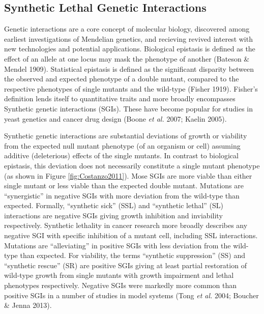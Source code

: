

\subsection{Synthetic Lethal Genetic Interactions}
Genetic interactions are a core concept of molecular biology, discovered among earliest investigations of Mendelian genetics, and recieving revived interest with new technologies and potential applications. Biological epistasis is defined as the effect of an allele at one locus may mask the phenotype of another (Bateson \& Mendel 1909). Statistical epistasis is defined as the significant disparity between the observed and expected phenotype of a double mutant, compared to the respective phenotypes of single mutants and the wild-type (Fisher 1919). Fisher's definition lends itself to quantitative traits and more broadly encompasses Synthetic genetic interactions (SGIs). These have become popular for studies in yeast genetics and cancer drug design (Boone\textit{ et al.} 2007; Kaelin 2005).


Synthetic genetic interactions are substantial deviations of growth or viability from the expected null mutant phenotype (of an organism or cell) assuming additive (deleterious) effects of the single mutants. In contrast to biological epistasis, this deviation does not necessarily constitute a single mutant phenotype (as shown in Figure \ref{fig:Costanzo2011}). Mose SGIs are more viable than either single mutant or less viable than the expected double mutant. Mutations are ``synergistic'' in negative SGIs with more deviation from the wild-type than expected. Formally, ``synthetic sick'' (SSL) and ``synthetic lethal'' (SL) interactions are negative SGIs giving growth inhibition and inviability respectively. Synthetic lethality in cancer research more broadly describes any negative SGI with specific inhibition of a mutant cell, including SSL interactions. Mutations are ``alleviating'' in positive SGIs with less deviation from the wild-type than expected. For viability, the terms ``synthetic suppression'' (SS) and ``synthetic rescue'' (SR) are positive SGIs giving at least partial restoration of wild-type growth from single mutants with growth impairment and lethal phenotypes respectively. Negative SGIs were markedly more common than positive SGIs in a number of studies in model systems (Tong\textit{ et al.} 2004; Boucher \& Jenna 2013). 

